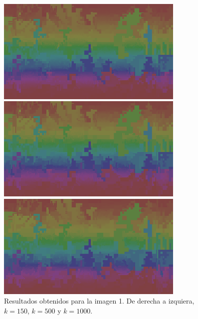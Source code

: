 \documentclass[letterpaper,11pt]{article} %
\begin{document}
\begin{figure}[H]
      \begin{minipage}{0.3\textwidth}
        \centering
        \includegraphics[width=0.8\textwidth]{images/result_a}
      \end{minipage}
      \begin{minipage}{0.3\textwidth}
        \centering
        \includegraphics[width=0.8\textwidth]{images/result_b}
      \end{minipage}
      \begin{minipage}{0.3\textwidth}
        \centering
        \includegraphics[width=0.8\textwidth]{images/result_c}
      \end{minipage}
      \caption{Resultados obtenidos para la imagen 1. De derecha a izquiera, $k=150$, $k=500$ y $k=1000$.}
    \end{figure}
\end{document}
